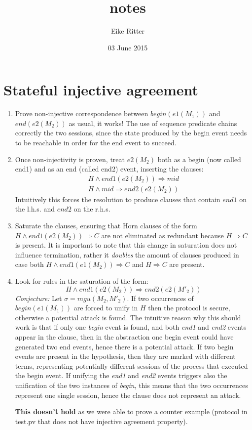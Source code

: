 \documentclass[11pt]{article}
\title{notes}
\author{Eike Ritter}
\date{03 June 2015}
\begin{document}
\maketitle

\setcounter{tocdepth}{3}
\tableofcontents
\vspace*{1cm}

\section{Stateful injective agreement}
\label{sec-1}


\begin{enumerate}
\item Prove non-injective correspondence between $begin(e1(M_1))$ and
   $end(e2(M_2))$ as usual, it works! The use of sequence predicate
   chains correctly the two sessions, since the state produced by the
   begin event needs to be reachable in order for the end event to
   succeed.
\item Once non-injectivity is proven, treat $e2(M_2)$ both as a begin
   (now called end1) and as an end (called end2) event, inserting the
   clauses:
   \begin{align*}
     H \wedge end1(e2(M_2)) \Rightarrow mid  \\
     H \wedge mid \Rightarrow end2(e2(M_2))
   \end{align*}
   Intuitively this forces the resolution to produce clauses that
   contain $end1$ on the l.h.s. and $end2$ on the r.h.s.
\item Saturate the clauses, ensuring that Horn clauses of the form $H
   \wedge end1(e2(M_2)) \Rightarrow C$ are not eliminated as redundant
   because $H \Rightarrow C$ is present. It is important to note that
   this change in saturation does not influence termination, rather it
   \emph{doubles} the amount of clauses produced in case both $H \wedge
   end1(e1(M_2)) \Rightarrow C$ and $H \Rightarrow C$ are present.
\item Look for rules in the saturation of the form:
   $$  H \wedge end1(e2(M_2)) \Rightarrow end2(e2(M'_2)) $$
   \emph{Conjecture:}
   Let $\sigma=mgu(M_2, M'_2)$. If two occurrences of $begin(e1(M_1))$
   are forced to unify in $H$ then the protocol is secure, otherwise a
   potential attack is found. The intuitive reason why this should
   work is that if only one \emph{begin} event is found, and both \emph{end1}
   and \emph{end2} events appear in the clause, then in the abstraction one
   begin event could have generated two end events, hence there is a
   potential attack. If two begin events are present in the
   hypothesis, then they are marked with different terms, representing
   potentially different sessions of the process that executed the
   begin event. If unifying the \emph{end1} and \emph{end2} events triggers also
   the unification of the two instances of \emph{begin}, this means that
   the two occurrences represent one single session, hence the clause
   does not represent an attack.

   \textbf{This doesn't hold} as we were able to prove a counter example
   (protocol in test.pv that does not have injective agreement
   property).
\end{enumerate}
\end{document}

